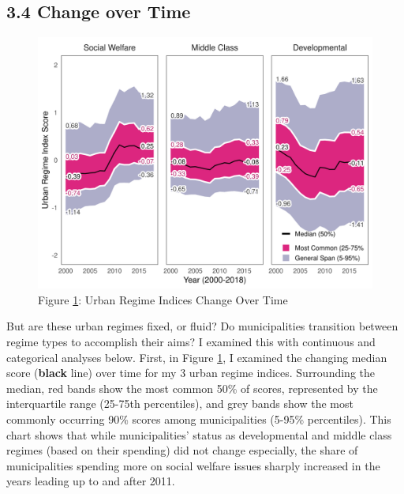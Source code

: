 \documentclass[preprint, 3p,
authoryear]{elsarticle} %
\begin{document}
\hypertarget{change-over-time}{%
\subsection{3.4 Change over Time}\label{change-over-time}}

\begin{figure}
\includegraphics[width=1\linewidth]{../viz/bands} \caption{Figure \ref{fig:bands}: Urban Regime Indices Change Over Time}\label{fig:bands}
\end{figure}

\doublespacing

But are these urban regimes fixed, or fluid? Do municipalities
transition between regime types to accomplish their aims? I examined
this with continuous and categorical analyses below. First, in Figure
\ref{fig:bands}, I examined the changing median score (\textbf{black}
line) over time for my 3 urban regime indices. Surrounding the median,
red bands show the most common 50\% of scores, represented by the
interquartile range (25-75th percentiles), and grey bands show the most
commonly occurring 90\% scores among municipalities (5-95\%
percentiles). This chart shows that while municipalities' status as
developmental and middle class regimes (based on their spending) did not
change especially, the share of municipalities spending more on social
welfare issues sharply increased in the years leading up to and after
2011.
\end{document}
